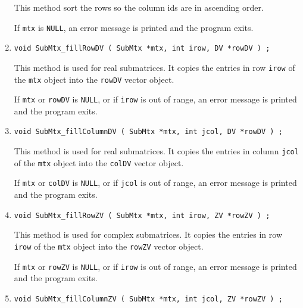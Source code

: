\begin{enumerate}
This method sort the rows so the column ids are in ascending order.
\par {}
If {\tt mtx} is {\tt NULL},
an error message is printed and the program exits.
\item
\begin{verbatim}
void SubMtx_fillRowDV ( SubMtx *mtx, int irow, DV *rowDV ) ;
\end{verbatim}
This method is used for real submatrices.
It copies the entries in row {\tt irow} of the {\tt mtx} object
into the {\tt rowDV} vector object.
\par {}
If {\tt mtx} or {\tt rowDV} is {\tt NULL},
or if {\tt irow} is out of range,
an error message is printed and the program exits.
\item
\begin{verbatim}
void SubMtx_fillColumnDV ( SubMtx *mtx, int jcol, DV *rowDV ) ;
\end{verbatim}
This method is used for real submatrices.
It copies the entries in column {\tt jcol} of the {\tt mtx} object
into the {\tt colDV} vector object.
\par {}
If {\tt mtx} or {\tt colDV} is {\tt NULL},
or if {\tt jcol} is out of range,
an error message is printed and the program exits.
\item
\begin{verbatim}
void SubMtx_fillRowZV ( SubMtx *mtx, int irow, ZV *rowZV ) ;
\end{verbatim}
This method is used for complex submatrices.
It copies the entries in row {\tt irow} of the {\tt mtx} object
into the {\tt rowZV} vector object.
\par {}
If {\tt mtx} or {\tt rowZV} is {\tt NULL},
or if {\tt irow} is out of range,
an error message is printed and the program exits.
\item
\begin{verbatim}
void SubMtx_fillColumnZV ( SubMtx *mtx, int jcol, ZV *rowZV ) ;
\end{verbatim}

\end{enumerate}
